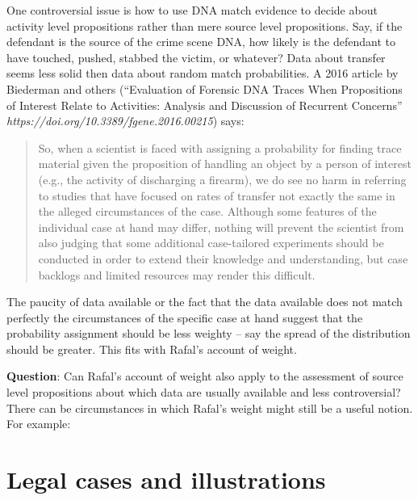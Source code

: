 \documentclass[
  10pt,
  dvipsnames,enabledeprecatedfontcommands]{scrartcl}
\begin{document}
One controversial issue is how to use DNA match evidence to decide about
activity level propositions rather than mere source level propositions.
Say, if the defendant is the source of the crime scene DNA, how likely
is the defendant to have touched, pushed, stabbed the victim, or
whatever? Data about transfer seems less solid then data about random
match probabilities. A 2016 article by Biederman
and
others (``Evaluation of Forensic DNA Traces When Propositions of
Interest Relate to Activities: Analysis and Discussion of Recurrent
Concerns'' \textit{https://doi.org/10.3389/fgene.2016.00215}) says:

\begin{quote}
 So, when a scientist is faced with assigning a probability for finding trace material given the proposition of handling an object by a person of interest (e.g., the activity of discharging a firearm), we do see no harm in referring to studies that have focused on rates of transfer not exactly the same in the alleged circumstances of the case. Although some features of the individual case at hand may differ, nothing will prevent the scientist from also judging that some additional case-tailored experiments should be conducted in order to extend their knowledge and understanding, but case backlogs and limited resources may render this difficult.
\end{quote}

The paucity of data available or the fact that the data available does
not match perfectly the circumstances of the specific case at hand
suggest that the probability assignment should be less weighty -- say
the spread of the distribution should be greater. This fits with Rafal's
account of weight.


\textbf{Question}: Can Rafal's account of weight also apply to the
assessment of source level propositions about which data are usually
available and less controversial? There can be circumstances in which
Rafal's weight might still be a useful notion. For example:

\hypertarget{legal-cases-and-illustrations}{%
\section{Legal cases and
illustrations}\label{legal-cases-and-illustrations}}
\end{document}
